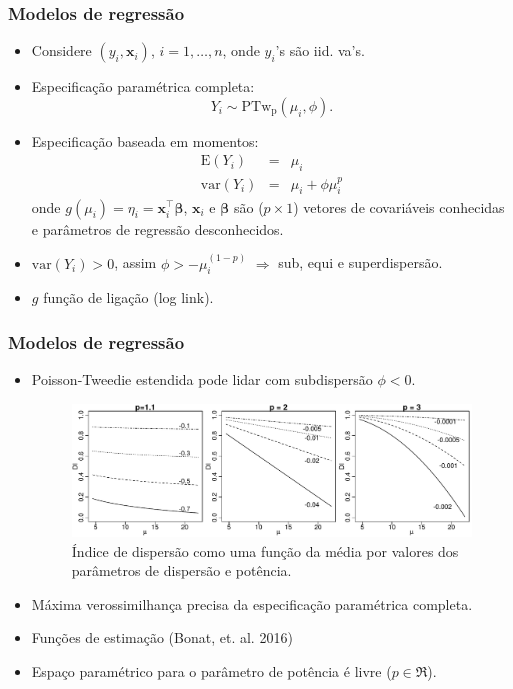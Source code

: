 \documentclass[10pt, aspectratio=169]{beamer}\usepackage[]{graphicx}\usepackage[]{color}
\begin{document}
\begin{frame}[c]
\frametitle{Modelos de regressão}
\begin{itemize}
\item Considere $(y_i, \boldsymbol{x}_i)$, $i = 1, \ldots, n$, onde
$y_i$'s são iid. va's.
\item Especificação paramétrica completa: $$Y_i \sim \mathrm{PTw_p}(\mu_i, \phi).$$
\item Especificação baseada em momentos:
\begin{eqnarray}
\label{marginalGaussian}
\mathrm{E}(Y_i) &=& \mu_i \nonumber    \\
\mathrm{var}(Y_i) &=& \mu_i + \phi\mu_i^p \nonumber
\end{eqnarray}
onde $g(\mu_i) = \eta_i = \boldsymbol{x}_i^{\top} \boldsymbol{\beta}$,
$\boldsymbol{x}_i$ e $\boldsymbol{\beta}$ são ($p \times 1$) vetores
de covariáveis conhecidas e parâmetros de regressão desconhecidos.
\item $\mathrm{var}(Y_i) > 0$, assim $\phi > - \mu^{(1-p)}_i$ $\Longrightarrow$ sub, equi e superdispersão.
\item $g$ função de ligação (log link).
\end{itemize}
\end{frame}

\begin{frame}[c]
\frametitle{Modelos de regressão}
\begin{itemize}
\item Poisson-Tweedie estendida pode lidar com subdispersão $\phi < 0$.
\begin{figure}[h]
\includegraphics[scale=0.4]{images/Rplot.pdf}
\caption{\tiny{Índice de dispersão como uma função da média por valores dos parâmetros de dispersão e potência.}}
\label{SUBPTW}
\centering
\end{figure}
\item Máxima verossimilhança precisa da especificação paramétrica completa.
\item Funções de estimação (Bonat, et. al. 2016)
\item Espaço paramétrico para o parâmetro de potência é livre ($p \in \Re$).
\end{itemize}
\end{frame}
\end{document}
